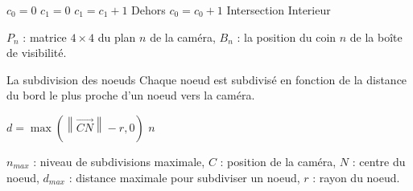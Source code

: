 \documentclass{beamer}
\begin{document}
\begin{frame}
\begin{multicols}{2}
  \begin{algorithmic}[1]
    \STATE $c_0 = 0$
      \STATE $c_1 = 0$
	  \STATE $c_1 = c_1 + 1$
	\ENDIF
      \ENDFOR
	\RETURN Dehors
      \ELSE
	\STATE $c_0 = c_0 + 1$
      \ENDIF
    \ENDFOR
      \RETURN Intersection
    \ELSE
      \RETURN Interieur
    \ENDIF
  \end{algorithmic}
\end{multicols}

  $P_n$ : matrice $4 \times 4$ du plan $n$ de la caméra, $B_n$ : la position du coin $n$ de la boîte de visibilité.
\end{frame}


\begin{frame}{La subdivision des noeuds}
  Chaque noeud est subdivisé en fonction de la distance du bord le plus proche d'un noeud vers la caméra.
  \begin{algorithmic}[1]
    \STATE $d = \max(\left\|\overrightarrow{CN}\right\| - r, 0)$
	\RETURN $n$
      \ENDIF
    \ENDFOR
  \end{algorithmic}
  $n_{max}$ : niveau de subdivisions maximale, $C$ : position de la caméra, $N$ : centre du noeud, 
  $d_{max}$ : distance maximale pour subdiviser un noeud, $r$ : rayon du noeud.

  
\end{frame}
\end{document}
